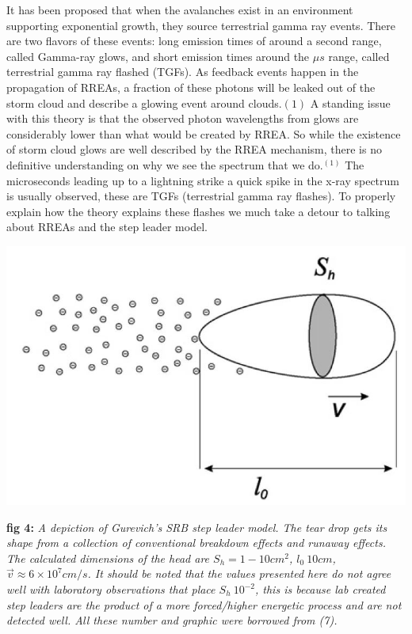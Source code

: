 \documentclass[11pt]{article}
\begin{document}
    It has been proposed that when the avalanches exist in an environment supporting exponential growth, they source terrestrial gamma ray events. There are two flavors of these events: long emission times of around a second range, called Gamma-ray glows, and short emission times around the $\mu s$ range, called terrestrial gamma ray flashed (TGFs). As feedback events happen in the propagation of RREAs, a fraction of these photons will be leaked out of the storm cloud and describe a glowing event around clouds.${(1)}$ A standing issue with this theory is that the observed photon wavelengths from glows are considerably lower than what would be created by RREA. So while the existence of storm cloud glows are well described by the RREA mechanism, there is no definitive understanding on why we see the spectrum that we do.$^{(1)}$ The microseconds leading up to a lightning strike a quick spike in the x-ray spectrum is usually observed, these are TGFs (terrestrial gamma ray flashes). To properly explain how the theory explains these flashes we much take a detour to talking about RREAs and the step leader model.
    
    \begin{center}
        \includegraphics[width=\linewidth]{images/step leader.JPG}
    \end{center}
    \textbf{fig 4:} \textit{A depiction of Gurevich's SRB step leader model. The tear drop gets its shape from a collection of conventional breakdown effects and runaway effects. The calculated dimensions of the head are $S_h = 1-10 cm^2$, $l_0 ~ 10 cm$, $\Vec{v} \approx 6 \times 10^7 cm/s$. It should be noted that the values presented here do not agree well with laboratory observations that place $S_h ~ 10^{-2}$, this is because lab created step leaders are the product of a more forced/higher energetic process and are not detected well. All these number and graphic were borrowed from (7).}
    
\end{document}
